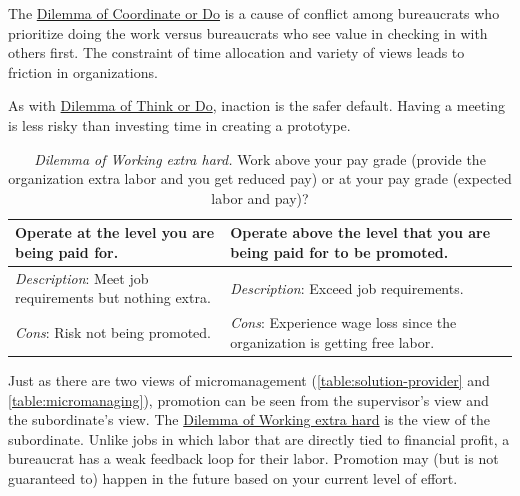 The \href{table:meetings-versus-work}{Dilemma of Coordinate or Do} is a cause of conflict among bureaucrats who prioritize doing the work versus bureaucrats who see value in checking in with others first. The constraint of time allocation and variety of views leads to friction in organizations.

As with \href{table:forest-vs-trees}{Dilemma of Think or Do}, inaction is the safer default. Having a meeting is less risky than investing time in creating a prototype. 

\begin{center}
\begin{table}[H] %
\begin{tabular}{ | m{\dilemmatablewidth}| m{\dilemmatablewidth} | } 
  \hline
  \textbf{Operate at the level you are being paid for.} &
  \textbf{Operate above the level that you are being paid for to be promoted.} \\
  \hline
  \textit{Description}: Meet job requirements but nothing extra. &
  \textit{Description}: Exceed job requirements. \\
  \hline
  \textit{Cons}: Risk not being promoted. & 
  \textit{Cons}: Experience wage loss since the organization is getting free labor. \\
  \hline
\end{tabular}
\caption{\textit{Dilemma of Working extra hard.}
Work above your pay grade (provide the organization extra labor and you get reduced pay) or at your pay grade (expected labor and pay)?
}
\label{table:work-extra-or-work-as-expected}
\end{table}
\end{center}

Just as there are two views of micromanagement (\ref{table:solution-provider} and \ref{table:micromanaging}), promotion can be seen from the supervisor's view and the subordinate's view. The \href{table:work-extra-or-work-as-expected}{Dilemma of Working extra hard} is the view of the subordinate. Unlike jobs in which labor that are directly tied to financial profit, a bureaucrat has a weak feedback loop for their labor. Promotion may (but is not guaranteed to) happen in the future based on your current level of effort. 

